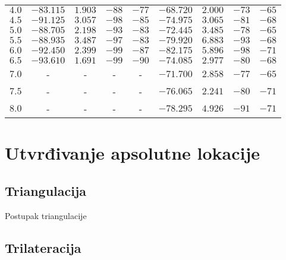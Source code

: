 \begin{table}[H]
\begin{tabular}{|c|cccc||cccc|}
	$4.0$ & $-83.115$ & $1.903$ & $-88$ & $-77$ & $-68.720$ & $2.000$ & $-73$ & $-65$ \\ %
	$4.5$ & $-91.125$ & $3.057$ & $-98$ & $-85$ & $-74.975$ & $3.065$ & $-81$ & $-68$ \\ %
	$5.0$ & $-88.705$ & $2.198$ & $-93$ & $-83$ & $-72.445$ & $3.485$ & $-78$ & $-65$ \\ %
	$5.5$ & $-88.935$ & $3.487$ & $-97$ & $-83$ & $-79.920$ & $6.883$ & $-93$ & $-68$ \\ %
	$6.0$ & $-92.450$ & $2.399$ & $-99$ & $-87$ & $-82.175$ & $5.896$ & $-98$ & $-71$ \\ %
	$6.5$ & $-93.610$ & $1.691$ & $-99$ & $-90$ & $-74.085$ & $2.977$ & $-80$ & $-68$ \\ %
	$7.0$ & - & - & - & - & $-71.700$ & $2.858$ & $-77$ & $-65$ \\ %
	$7.5$ & - & - & - & - & $-76.065$ & $2.241$ & $-80$ & $-71$ \\ %
	$8.0$ & - & - & - & - & $-78.295$ & $4.926$ & $-91$ & $-71$ \\ %
	\hline 
	\end{tabular}
\end{table}


\section*{Utvrđivanje apsolutne lokacije}

\subsection*{Triangulacija}

Postupak triangulacije

\subsection*{Trilateracija}
